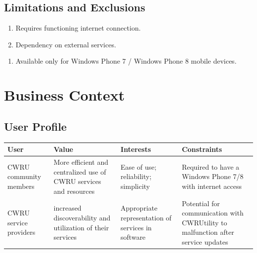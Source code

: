 \documentclass[pdftex,12pt,letter]{article}
\begin{document}
\subsection{Limitations and Exclusions}
\begin{enumerate}[L{I}-1:]
\item Requires functioning internet connection.
\item Dependency on external services.
\end{enumerate}
\begin{enumerate}[EX-1:]
\item Available only for Windows Phone 7 / Windows Phone 8 mobile devices.
\end{enumerate}
\section{Business Context}
\subsection{User Profile}
\begin{table}[h]
\begin{tabularx}{\textwidth}[t]{|Y|Y|Y|Y|}
\hline
\bfseries User & \bfseries Value & \bfseries Interests & \bfseries Constraints\\ \hline
CWRU community members & More efficient and centralized use of CWRU services and resources & Ease of use; reliability; simplicity & Required to have a Windows Phone 7/8 with internet access \\ \hline
CWRU service providers & increased discoverability and utilization of their services & Appropriate representation of services in software & Potential for communication with CWRUtility to malfunction after service updates \\ \hline
\end{tabularx}
\end{table}

\end{document}
